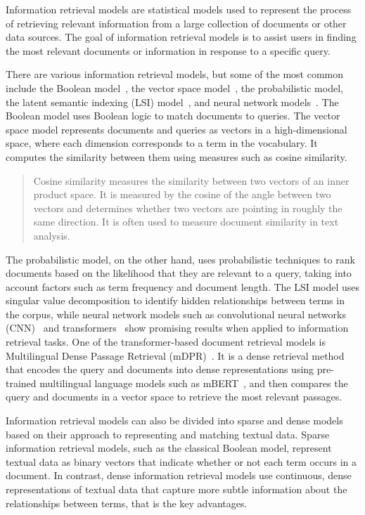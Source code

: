 Information retrieval models are statistical models used to represent the process of retrieving relevant information from a large collection of documents or other data sources. The goal of information retrieval models is to assist users in finding the most relevant documents or information in response to a specific query.

There are various information retrieval models, but some of the most common include the Boolean model~\cite{BM25}, the vector space model~\cite{vectore_space}, the probabilistic model, the latent semantic indexing (LSI) model~\cite{LSI}, and neural network models~\cite{nn_models}. The Boolean model uses Boolean logic to match documents to queries. The vector space model represents documents and queries as vectors in a high-dimensional space, where each dimension corresponds to a term in the vocabulary. It computes the similarity between them using measures such as cosine similarity. 
\begin{quotation}
    Cosine similarity measures the similarity between two vectors of an inner product space. It is measured by the cosine of the angle between two vectors and determines whether two vectors are pointing in roughly the same direction. It is often used to measure document similarity in text analysis. \cite{cosine_similarity}
\end{quotation}
The probabilistic model, on the other hand, uses probabilistic techniques to rank documents based on the likelihood that they are relevant to a query, taking into account factors such as term frequency and document length. The LSI model uses singular value decomposition to identify hidden relationships between terms in the corpus, while neural network models such as convolutional neural networks (CNN)~\cite{cnn} and transformers~\cite{transformer} show promising results when applied to information retrieval tasks. One of the transformer-based document retrieval models is Multilingual Dense Passage Retrieval (mDPR)~\cite{mDPR}. It is a dense retrieval method that encodes the query and documents into dense representations using pre-trained multilingual language models such as mBERT~\cite{mbert}, and then compares the query and documents in a vector space to retrieve the most relevant passages.

Information retrieval models can also be divided into sparse and dense models based on their approach to representing and matching textual data. Sparse information retrieval models, such as the classical Boolean model, represent textual data as binary vectors that indicate whether or not each term occurs in a document. In contrast, dense information retrieval models use continuous, dense representations of textual data that capture more subtle information about the relationships between terms, that is the key advantages.

